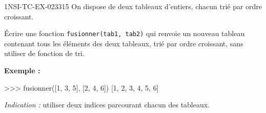 \begin{exercice}{1NSI-TC-EX-023}{3}{15}
On dispose de deux tableaux d'entiers, chacun trié par ordre croissant.

Écrire une fonction \lstinline{fusionner(tab1, tab2)} qui renvoie un nouveau tableau
contenant tous les éléments des deux tableaux, trié par ordre croissant, sans
utiliser de fonction de tri.

\textbf{Exemple :}
\begin{console}
>>> fusionner([1, 3, 5], [2, 4, 6])
[1, 2, 3, 4, 5, 6]
\end{console}

\textit{Indication :} utiliser deux indices parcourant chacun des tableaux.
\end{exercice}
